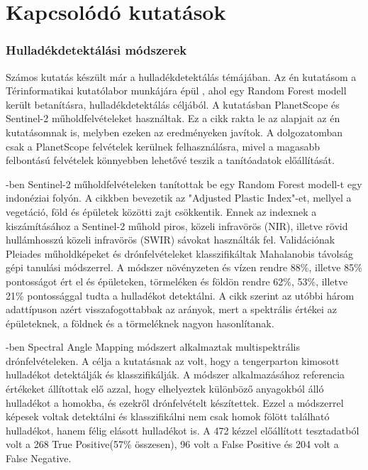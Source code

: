 \chapter{Kapcsolódó kutatások}
\label{ch:related_research}

\subsection{Hulladékdetektálási módszerek}

Számos kutatás készült már a hulladékdetektálás témájában. Az én kutatásom a Térinformatikai kutatólabor munkájára épül \cite{magyar2023}, ahol egy Random Forest modell került betanításra, hulladékdetektálás céljából. A kutatásban PlanetScope és Sentinel-2 műholdfelvételeket használtak. Ez a cikk rakta le az alapjait az én kutatásomnak is, melyben ezeken az eredményeken javítok. A dolgozatomban csak a PlanetScope felvételek kerülnek felhasználásra, mivel a magasabb felbontású felvételek könnyebben lehetővé teszik a tanítóadatok előállítását. 

\cite{sakti2023}-ben Sentinel-2 műholdfelvételeken tanítottak be egy Random Forest modell-t egy indonéziai folyón. A cikkben bevezetik az "Adjusted Plastic Index"-et, mellyel a vegetáció, föld és épületek közötti zajt csökkentik. Ennek az indexnek a kiszámításához a Sentinel-2 műhold piros, közeli infravörös (NIR), illetve rövid hullámhosszú közeli infravörös (SWIR) sávokat használták fel. Validációnak Pleiades műholdképeket és drónfelvételeket klasszifikáltak Mahalanobis távolság gépi tanulási módszerrel. A módszer növényzeten és vízen rendre 88\%, illetve 85\% pontosságot ért el és épületeken, törmeléken és földön rendre 62\%, 53\%, illetve 21\% pontossággal tudta a hulladékot detektálni. A cikk szerint az utóbbi három adattípuson azért visszafogottabbak az arányok, mert a spektrális értékei az épületeknek, a földnek és a törmeléknek nagyon hasonlítanak.

\cite{goncalves2022}-ben Spectral Angle Mapping módszert alkalmaztak multispektrális drónfelvételeken. A célja a kutatásnak az volt, hogy a tengerparton kimosott hulladékot detektálják és klasszifikálják. A módszer alkalmazásához referencia értékeket állítottak elő azzal, hogy elhelyeztek különböző anyagokból álló hulladékot a homokba, és ezekről drónfelvételt készítettek. Ezzel a módszerrel képesek voltak detektálni és klasszifikálni nem csak homok fölött található hulladékot, hanem félig elásott hulladékot is. A 472 kézzel előállított tesztadatból volt a 268 True Positive(57\% összesen), 96 volt a False Positive és 204 volt a False Negative.


